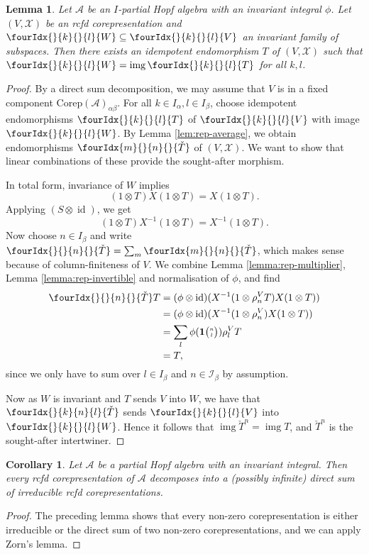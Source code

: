 \documentclass[10pt]{article}
\DeclareMathOperator{\id}{id}
\DeclareMathOperator{\img}{img}
\newcommand{\Corep}{\mathrm{Corep}}
\newcommand{\Grt}[3]{#1{\tiny {\begin{pmatrix} #2\\#3\end{pmatrix}}}}
\newcommand{\UnitC}[2]{\Grt{\mathbf{1}}{#1}{#2}}
\newcommand{\Gr}[5]{\fourIdx{#2}{#4}{#3}{#5}{#1}}%
\newcommand{\Gru}[3]{\Gr{#1}{}{}{#2}{#3}}
\newcommand{\Grd}[3]{\Gr{#1}{#2}{#3}{}{}}
\newtheorem{Lem}[Theorem]{Lemma}
\newtheorem{Cor}[Theorem]{Corollary}
\theoremstyle{definition}
\numberwithin{equation}{section}
\begin{document}
\begin{Lem}
  Let $\mathscr{A}$ be an $I$-partial Hopf algebra with an invariant integral $\phi$.
  Let $(V,\mathscr{X})$ be an rcfd corepresentation
  and $\Gru{W}{k}{l} \subseteq \Gru{V}{k}{l}$ an invariant family of
  subspaces. Then there exists an idempotent endomorphism $T$ of
  $(V,\mathscr{X})$ such that $\Gru{W}{k}{l}=\img\Gru{T}{k}{l}$ for
  all $k,l$.
\end{Lem}
\begin{proof}
By a direct sum decomposition, we may assume that $V$ is in a fixed component $\Corep(\mathscr{A})_{\alpha\beta}$. For all $k\in I_{\alpha},l\in I_{\beta}$, choose idempotent endomorphisms $\Gru{T}{k}{l}$ of $\Gru{V}{k}{l}$
  with image $\Gru{W}{k}{l}$. By Lemma \ref{lem:rep-average}, we obtain
  endomorphisms $\Grd{\check{T}}{m}{n}$ of $(V,\mathscr{X})$. We want to show
  that linear combinations of these provide the sought-after morphism.
  
    In
  total form, invariance of $W$ implies  \[(1 \otimes T)X(1
  \otimes T)=X(1\otimes T).\] Applying
 $(S \otimes \id)$, we get   \[(1 \otimes T)X^{-1}(1
  \otimes T)=X^{-1}(1\otimes T).\]
Now choose $n\in I_{\beta}$ and write $\Grd{\check{T}}{}{n} = \sum_m \Grd{\check{T}}{m}{n}$, which makes sense because of column-finiteness of $V$. We combine  Lemma
  \ref{lemma:rep-multiplier}, Lemma \ref{lemma:rep-invertible} and
  normalisation of $\phi$, and find
  \begin{align*}
    \Grd{\check{T}}{}{n} T &= (\phi \otimes \id)(X^{-1}(1 \otimes
    \rho_{n}^{V}T)X(1 \otimes T)) \\  &= 
     (\phi \otimes \id)(X^{-1}(1 \otimes
    \rho_{n}^{V})X(1 \otimes T)) \\
    &=
  \sum_l \phi(\UnitC{n}{l}) \rho^{V}_{l}T \\& =T,
  \end{align*}
 since we only have to sum over $l\in I_{\beta}$ and $n\in \mathscr{I}_{\beta}$ by assumption. 
 
 Now as $W$ is invariant and $T$ sends $V$ into $W$, we have that $\Gr{\check{T}}{}{n}{k}{l}$ sends $\Gru{V}{k}{l}$ into $\Gru{W}{k}{l}$. Hence it follows that $\img{\check{T}^{n}}=\img T$, and $\check{T}^{n}$ is the sought-after intertwiner.
\end{proof}

\begin{Cor}  \label{cor:rep-cosemisimple}%
  Let $\mathscr{A}$ be a partial Hopf algebra with an invariant integral.  Then
  every rcfd corepresentation of $\mathscr{A}$ decomposes into a (possibly infinite) direct
  sum of irreducible rcfd corepresentations.
\end{Cor} 
\begin{proof} 
The preceding lemma shows that  every non-zero corepresentation is either
irreducible or the direct sum of two non-zero corepresentations, and we can apply Zorn's lemma.
\end{proof}
\end{document}
